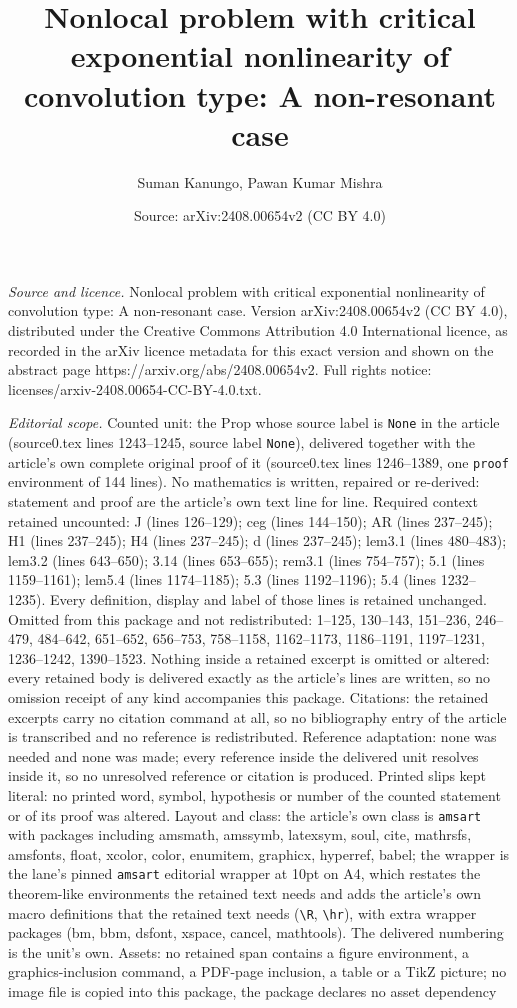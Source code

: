 \documentclass[10pt,a4paper]{amsart}
\title[Nonlocal problem with critical exponential nonlinearity of c]{Nonlocal problem with critical exponential nonlinearity of convolution type: A non-resonant case}
\author{Suman Kanungo, Pawan Kumar Mishra}
\date{Source: arXiv:2408.00654v2 (CC BY 4.0)}
\begin{document}
\maketitle

\noindent\emph{Source and licence.} Nonlocal problem with critical exponential nonlinearity of convolution type: A non-resonant case. Version arXiv:2408.00654v2 (CC BY 4.0), distributed under the Creative Commons Attribution 4.0 International licence, as recorded in the arXiv licence metadata for this exact version and shown on the abstract page https://arxiv.org/abs/2408.00654v2. Full rights notice: licenses/arxiv-2408.00654-CC-BY-4.0.txt.\par\smallskip

\noindent\textit{Editorial scope.} Counted unit: the Prop whose source label is \texttt{None} in the article (source0.tex lines 1243--1245, source label \texttt{None}), delivered together with the article's own complete original proof of it (source0.tex lines 1246--1389, one \texttt{proof} environment of 144 lines). No mathematics is written, repaired or re-derived: statement and proof are the article's own text line for line. Required context retained uncounted: J (lines 126--129); ceg (lines 144--150); AR (lines 237--245); H1 (lines 237--245); H4 (lines 237--245); d (lines 237--245); lem3.1 (lines 480--483); lem3.2 (lines 643--650); 3.14 (lines 653--655); rem3.1 (lines 754--757); 5.1 (lines 1159--1161); lem5.4 (lines 1174--1185); 5.3 (lines 1192--1196); 5.4 (lines 1232--1235). Every definition, display and label of those lines is retained unchanged. Omitted from this package and not redistributed: 1--125, 130--143, 151--236, 246--479, 484--642, 651--652, 656--753, 758--1158, 1162--1173, 1186--1191, 1197--1231, 1236--1242, 1390--1523. Nothing inside a retained excerpt is omitted or altered: every retained body is delivered exactly as the article's lines are written, so no omission receipt of any kind accompanies this package. Citations: the retained excerpts carry no citation command at all, so no bibliography entry of the article is transcribed and no reference is redistributed. Reference adaptation: none was needed and none was made; every reference inside the delivered unit resolves inside it, so no unresolved reference or citation is produced. Printed slips kept literal: no printed word, symbol, hypothesis or number of the counted statement or of its proof was altered. Layout and class: the article's own class is \texttt{amsart} with packages including amsmath, amssymb, latexsym, soul, cite, mathrsfs, amsfonts, float, xcolor, color, enumitem, graphicx, hyperref, babel; the wrapper is the lane's pinned \texttt{amsart} editorial wrapper at 10pt on A4, which restates the theorem-like environments the retained text needs and adds the article's own macro definitions that the retained text needs (\texttt{\textbackslash R}, \texttt{\textbackslash hr}), with extra wrapper packages (bm, bbm, dsfont, xspace, cancel, mathtools). The delivered numbering is the unit's own. Assets: no retained span contains a figure environment, a graphics-inclusion command, a PDF-page inclusion, a table or a TikZ picture; no image file is copied into this package, the package declares no asset dependency 
\end{document}
